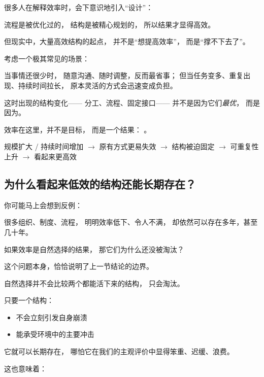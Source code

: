 \documentclass[../main.tex]{subfiles}
\begin{document}
\begin{readingnote}
	很多人在解释效率时，会下意识地引入“设计”：
	
	流程是被优化过的，
	结构是被精心规划的，
	所以结果才显得高效。
	
	但现实中，大量高效结构的起点，
	并不是“想提高效率”，
	而是“撑不下去了”。
\end{readingnote}

考虑一个极其常见的场景：

当事情还很少时，
随意沟通、随时调整，反而最省事；
但当任务变多、重复出现、持续时间拉长，
原本灵活的方式会迅速变成负担。

这时出现的结构变化——
分工、流程、固定接口——
并不是因为它们\emph{最优}，
而是因为。

效率在这里，并不是目标，
而是一个结果：
。

\begin{logicmap}
	规模扩大 / 持续时间增加
	$\rightarrow$ 原有方式更易失效
	$\rightarrow$ 结构被迫固定
	$\rightarrow$ 可重复性上升
	$\rightarrow$ 看起来更高效
\end{logicmap}

\subsection{为什么看起来低效的结构还能长期存在？} \label{math:survival_constraint}

\begin{readingnote}
	你可能马上会想到反例：
	
	很多组织、制度、流程，
	明明效率低下、令人不满，
	却依然可以存在多年，甚至几十年。
	
	如果效率是自然选择的结果，
	那它们为什么还没被淘汰？
\end{readingnote}

这个问题本身，恰恰说明了上一节结论的边界。

自然选择并不会比较两个都能活下来的结构，
只会淘汰。

只要一个结构：
\begin{itemize}
	\item 不会立刻引发自身崩溃
	\item 能承受环境中的主要冲击
\end{itemize}

它就可以长期存在，
哪怕它在我们的主观评价中显得笨重、迟缓、浪费。

这也意味着：

\end{document}

